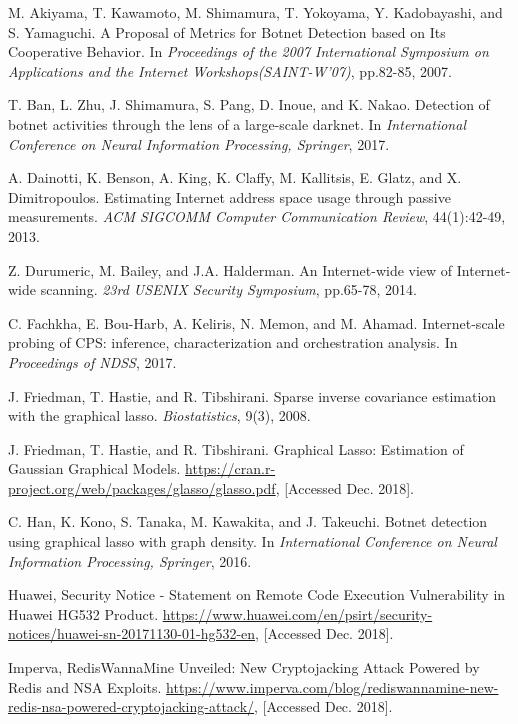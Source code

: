 \documentclass[conference]{IEEEtran}
\begin{document}
\begin{thebibliography}{99}
M. Akiyama, T. Kawamoto, M. Shimamura, T. Yokoyama, Y. Kadobayashi, and S. Yamaguchi. A Proposal of Metrics for Botnet Detection based on Its Cooperative Behavior. In {\it Proceedings of the 2007 International Symposium on Applications and the Internet Workshops(SAINT-W'07)}, pp.82-85, 2007.

T. Ban, L. Zhu, J. Shimamura, S. Pang, D. Inoue, and K. Nakao. Detection of botnet activities through the lens of a large-scale darknet. In {\it International Conference on Neural Information Processing, Springer}, 2017.

A. Dainotti, K. Benson, A. King, K. Claffy, M. Kallitsis, E. Glatz, and X. Dimitropoulos. Estimating Internet address space usage through passive measurements. {\it ACM SIGCOMM Computer Communication Review}, 44(1):42-49, 2013.

Z. Durumeric, M. Bailey, and J.A. Halderman. An Internet-wide view of Internet-wide scanning. {\it 23rd USENIX Security Symposium}, pp.65-78, 2014.

C. Fachkha, E. Bou-Harb, A. Keliris, N. Memon, and M. Ahamad. Internet-scale probing of CPS: inference, characterization and orchestration analysis. In {\it Proceedings of NDSS}, 2017.

J. Friedman, T. Hastie, and R. Tibshirani. Sparse inverse covariance estimation with the graphical lasso. {\it Biostatistics}, 9(3), 2008.

J. Friedman, T. Hastie, and R. Tibshirani. Graphical Lasso: Estimation of Gaussian Graphical Models. \url{https://cran.r-project.org/web/packages/glasso/glasso.pdf}, [Accessed Dec. 2018].

C. Han, K. Kono, S. Tanaka, M. Kawakita, and J. Takeuchi. Botnet detection using graphical lasso with graph density. In {\it International Conference on Neural Information Processing, Springer}, 2016.

Huawei, Security Notice - Statement on Remote Code Execution Vulnerability in Huawei HG532 Product. \url{https://www.huawei.com/en/psirt/security-notices/huawei-sn-20171130-01-hg532-en}, [Accessed Dec. 2018].

Imperva, RedisWannaMine Unveiled: New Cryptojacking Attack Powered by Redis and NSA Exploits. \url{https://www.imperva.com/blog/rediswannamine-new-redis-nsa-powered-cryptojacking-attack/}, [Accessed Dec. 2018].


\end{thebibliography}
\end{document}
